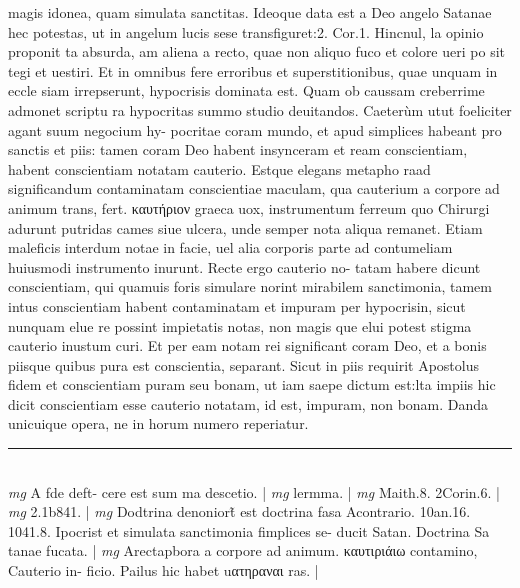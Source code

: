 \documentclass{article}
\begin{document}
\begin{pages}
magis idonea, quam simulata sanctitas. Ideoque data est a Deo angelo Satanae hec potestas, ut in angelum lucis sese transfiguret:2. Cor.1. Hincnul, la opinio proponit ta absurda, am aliena a recto, quae non aliquo fuco et colore ueri po sit tegi et uestiri. Et in omnibus fere erroribus et superstitionibus, quae unquam in eccle siam irrepserunt, hypocrisis dominata est. Quam ob caussam creberrime admonet scriptu ra hypocritas summo studio deuitandos. Caeterùm utut foeliciter agant suum negocium hy- pocritae coram mundo, et apud simplices habeant pro sanctis et piis: tamen coram Deo habent insynceram et ream conscientiam, habent conscientiam notatam cauterio. Estque elegans metapho raad significandum contaminatam conscientiae maculam, qua cauterium a corpore ad animum trans, fert. καυτήριον graeca uox, instrumentum ferreum quo Chirurgi adurunt putridas cames siue ulcera, unde semper nota aliqua remanet. Etiam maleficis interdum notae in facie, uel alia corporis parte ad contumeliam huiusmodi instrumento inurunt. Recte ergo cauterio no- tatam habere dicunt conscientiam, qui quamuis foris simulare norint mirabilem sanctimonia, tamem intus conscientiam habent contaminatam et impuram per hypocrisin, sicut nunquam elue re possint impietatis notas, non magis que elui potest stigma cauterio inustum curi. Et per eam notam rei significant coram Deo, et a bonis piisque quibus pura est conscientia, separant. Sicut in piis requirit Apostolus fidem et conscientiam puram seu bonam, ut iam saepe dictum est:lta impiis hic dicit conscientiam esse cauterio notatam, id est, impuram, non bonam. Danda unicuique opera, ne in horum numero reperiatur.  \pend
\vspace{0.5cm}\noindent
\vspace{0.2cm}\rule{1cm}{0.2pt}\\ 
\hspace{0.2cm}\textit{mg}
\footnotesize A fde deft- cere est sum ma descetio. 
\normalsize| 
\hspace{0.2cm}\textit{mg}
\footnotesize lermma. 
\normalsize| 
\hspace{0.2cm}\textit{mg}
\footnotesize Maith.8. 2Corin.6. 
\normalsize| 
\hspace{0.2cm}\textit{mg}
\footnotesize 2.1b841. 
\normalsize| 
\hspace{0.2cm}\textit{mg}
\footnotesize Dodtrina denoniort̃ est doctrina fasa Acontrario. 10an.16. 1041.8. Ipocrist et simulata sanctimonia fimplices se- ducit Satan. Doctrina Sa tanae fucata. 
\normalsize| 
\hspace{0.2cm}\textit{mg}
\footnotesize Arectapbora a corpore ad animum. καυτιριάιω contamino, Cauterio in- ficio. Pailus hic habet uατηραναι ras. 
\normalsize| 

\end{pages}
\end{document}
